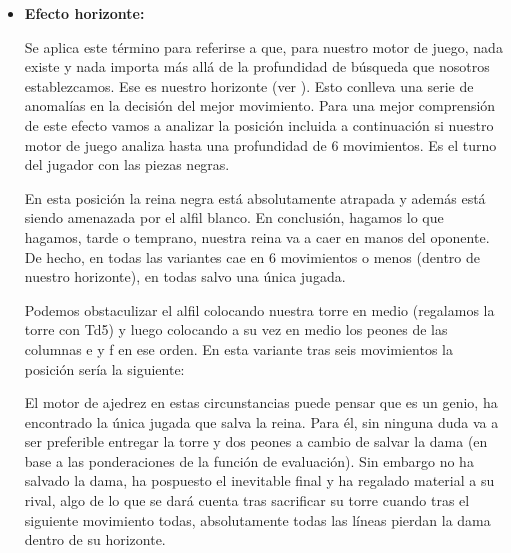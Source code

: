 \documentclass[letterpaper,12pt]{article}
\begin{document}
\begin{itemize}
    \item \textbf{Efecto horizonte:}
    
    Se aplica este término para referirse a que, para nuestro motor de juego, nada existe
    y nada importa más allá de la profundidad de búsqueda que nosotros establezcamos. Ese
    es nuestro horizonte (ver \cite{Search6}). Esto conlleva una serie de anomalías en la
    decisión del mejor movimiento. Para una mejor comprensión de este efecto vamos a analizar
    la posición incluida a continuación si nuestro motor de juego analiza hasta una 
    profundidad de 6 movimientos. Es el turno del jugador con las piezas negras.
    
        \begin{center}
         \chessboard
         [
            maxfield=h8,
            startfen=a8,
            addfen=3r2k1/1Q4pp/2B5/4p3/5p2/8/PPP4p/1KR3bq,
            showmover=false
        ]   
    \end{center}
    
    En esta posición la reina negra está absolutamente atrapada y además está siendo amenazada
    por el alfil blanco. En conclusión, hagamos lo que hagamos, tarde o temprano, nuestra 
    reina va a caer en manos del oponente. De hecho, en todas las variantes cae en 6 movimientos
    o menos (dentro de nuestro horizonte), en todas salvo una única jugada.
    
    Podemos obstaculizar el alfil colocando nuestra torre en medio (regalamos la torre con Td5) 
    y luego colocando a su vez en medio los peones de las columnas e y f en ese orden. En esta
    variante tras seis movimientos la posición sería la siguiente:
    
        \begin{center}
         \chessboard
         [
            maxfield=h8,
            startfen=a8,
            addfen=6k1/1Q4pp/8/8/8/5B2/PPP4p/1KR3bq,
            showmover=false
        ]   
    \end{center}
    
    El motor de ajedrez en estas circunstancias puede pensar que es un genio, ha encontrado
    la única jugada que salva la reina. Para él, sin ninguna duda va a ser preferible entregar
    la torre y dos peones a cambio de salvar la dama (en base a las ponderaciones de la función
    de evaluación). Sin embargo no ha salvado la dama, ha pospuesto el inevitable final y ha
    regalado material a su rival, algo de lo que se dará cuenta tras sacrificar su torre cuando
    tras el siguiente movimiento todas, absolutamente todas las líneas pierdan la dama dentro
    de su horizonte.
    
\end{itemize}
\end{document}
